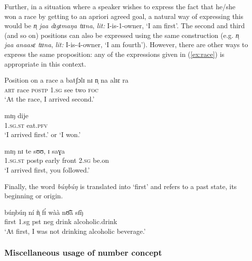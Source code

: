 \begin{exe}
\begin{exe}
\begin{exe}
{\begin{exe}
\begin{exe}
\begin{exe}
\begin{exe}
\begin{exe}
\begin{exe}
\begin{exe}
\begin{xlist}
\begin{exe}
\begin{exe}
\begin{exe}
 Further, in a situation where a speaker wishes to express the fact that he/she 
won a race by getting to an apriori agreed  goal, a natural way of expressing 
this would be  {\it n̩  jaa dɪgɪmaŋa tɪɪna},  {\it lit:} I-is-1-owner,  `I am 
first'. The second and third (and so on) positions can also be expressed using 
the same construction (e.g. {\it n̩  jaa anaasɛ tɪɪna}, {\it lit:} I-is-4-owner, 
 `I am fourth'). However,  there are other ways to express the same proposition: 
any of the expressions given in (\ref{ex:race}) is appropriate in this context.


\ea\label{ex:race}{\rm Position on a race}
\ea\label{ex:}
\gll a batʃɔlɪ nɪ n̩ na alɪɛ  ra\\   
 \textsc{art}  {race} \textsc{postp}   \textsc{1.sg}  {see} {two}   \textsc{foc}
\\
 \glt  `At the race, I arrived second.'

\ex\label{ex:}
\gll mɪŋ dije\\   
    \textsc{1.sg.st} {eat.\textsc{pfv}}  \\
 \glt  `I arrived  first.' or `I won.'

\ex\label{ex:}
\gll mɪŋ nɪ te sʊʊ, ɪ saɣa\\   
    \textsc{1.sg.st} {postp} {early} {front}  \textsc{2.sg} {be.on}\\
 \glt  `I arrived  first, you followed.'
\z
\z



Finally, the word {\it búŋbúŋ} is translated into `first' and refers to a past 
state, its beginning or origin.

\ea\label{ex:seqevent}
 \gll   búŋbúŋ ní ǹ̩ fɪ́ wàà nʊ̃̄ã̄ sɪ̄ŋ̀\\
first {\postp}  {\sc 1.sg} {\sc pst} {\sc neg} drink alcoholic.drink\\  
\glt  `At first, I was not drinking alcoholic beverage.'
\z


% 



\subsubsection{Miscellaneous usage of number concept} 
\label{sec:NUM-misc-usage}


\end{exe}
\end{exe}
\end{exe}
\end{xlist}
\end{exe}
\end{exe}
\end{exe}
\end{exe}
\end{exe}
\end{exe}
\end{exe}}
\end{exe}
\end{exe}
\end{exe}
